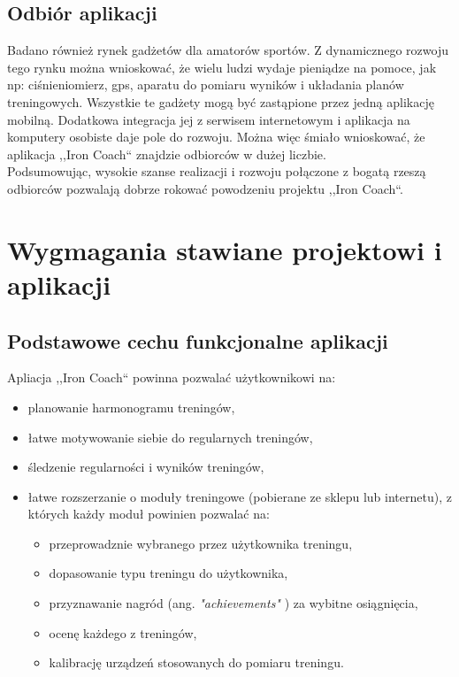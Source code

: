 \subsection{Odbiór aplikacji}
\noindent Badano również rynek gadżetów dla amatorów sportów. Z dynamicznego rozwoju tego rynku można wnioskować, że wielu ludzi wydaje pieniądze na pomoce, jak np: ciśnieniomierz, gps, aparatu do pomiaru wyników i układania planów treningowych. Wszystkie te gadżety mogą być zastąpione przez jedną aplikację mobilną. Dodatkowa integracja jej z serwisem internetowym i aplikacja na komputery osobiste daje pole do rozwoju. Można więc śmiało wnioskować, że aplikacja ,,Iron Coach`` znajdzie odbiorców w dużej liczbie. \\
Podsumowując, wysokie szanse realizacji i rozwoju połączone z bogatą rzeszą odbiorców pozwalają dobrze rokować powodzeniu projektu ,,Iron Coach``.
\clearpage
\section{Wygmagania stawiane projektowi i aplikacji}
\subsection{Podstawowe cechu funkcjonalne aplikacji}
\label{pfunk}
\noindent Apliacja ,,Iron Coach`` powinna pozwalać użytkownikowi na:
\begin{itemize}
  \item planowanie harmonogramu treningów,
  \item łatwe motywowanie siebie do regularnych treningów,
  \item śledzenie regularności i wyników treningów,
  \item łatwe rozszerzanie o moduły treningowe (pobierane ze sklepu lub internetu), z których każdy moduł powinien pozwalać na:
    \begin{itemize}
      \item przeprowadznie wybranego przez użytkownika treningu,
      \item dopasowanie typu treningu do użytkownika,
      \item przyznawanie nagród (ang. {\it "achievements"} \cite{Sł}) za wybitne osiągnięcia,
      \item ocenę każdego z treningów,
      \item kalibrację urządzeń stosowanych do pomiaru treningu.
    \end{itemize}
\end{itemize}
